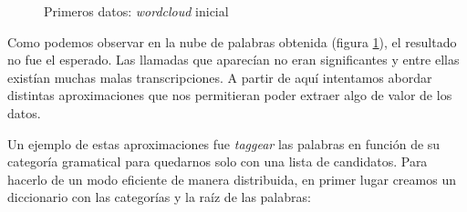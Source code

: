       \begin{figure}[!ht]
                    	\centering
                    	\caption{Primeros datos: \textit{wordcloud} inicial}
                    	\label{fig:wordcloudmalo1}
                    \end{figure}
              
              
Como podemos observar en la nube de palabras obtenida (figura \ref{fig:wordcloudmalo1}), el resultado no fue el esperado. Las llamadas que aparecían no eran significantes y entre ellas existían muchas malas  transcripciones. A partir de aquí intentamos abordar distintas aproximaciones que nos permitieran poder extraer algo de valor de los datos.

Un ejemplo de estas aproximaciones fue \textit{taggear} las palabras en  función de su categoría gramatical para quedarnos solo con una lista de candidatos. Para hacerlo de un modo eficiente de manera distribuida, en primer lugar creamos un diccionario con las categorías y la raíz de las palabras: 

          
\vspace{0.5cm}
          

